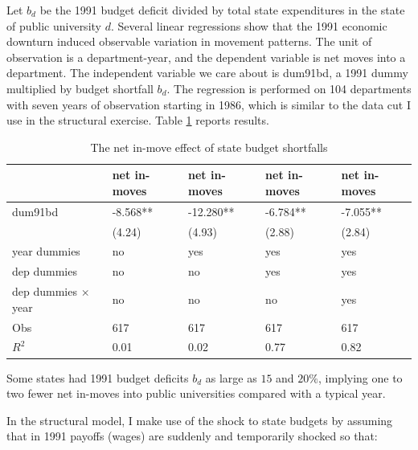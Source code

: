  Let $b_d$ be the 1991 budget deficit
divided by total state expenditures in the state of public university
$d$.   Several linear regressions show that the 1991 economic downturn induced observable variation
in movement patterns.  The unit of observation is a department-year, and the dependent variable
 is net moves into a department.  The independent variable we care about is dum91bd, a 1991
dummy multiplied by budget shortfall $b_d$. The regression is performed
on 104 departments with seven years of observation starting in 1986, which
is similar to the data cut I use in the structural exercise.
 Table \ref{tab:bd_reg} reports results.

\begin{table}[h]
    \centering
    \begin{tabular}{|l|l|l|l|l|}
        \hline
                            & net in-moves &   net in-moves &     net in-moves &    net in-moves \\   \hline
dum91bd                     &     -8.568** &     -12.280**  &      -6.784**    &      -7.055**   \\
                            &      (4.24)  &      (4.93)    &      (2.88)      &      (2.84)     \\
year dummies                &        no    &         yes    &          yes     &         yes     \\
dep dummies                 &        no    &         no     &          yes     &         yes     \\
dep dummies $\times$ year   & no           &  no            &   no             &  yes            \\  \hline
Obs                         & 617          &  617           &   617            &  617            \\
$R^2$                       & 0.01         &  0.02          &   0.77           &  0.82           \\  \hline
    \end{tabular}
    \caption{The net in-move effect of state budget shortfalls}
    \label{tab:bd_reg}
\end{table}

Some states had 1991 budget deficits $b_d$ as large as $15$ and $20\%$, implying
one to two fewer net in-moves into public universities compared with a typical year.

In the structural model, I make use of the shock to state budgets by assuming that in 1991 payoffs
 (wages) are suddenly and temporarily shocked so that:

